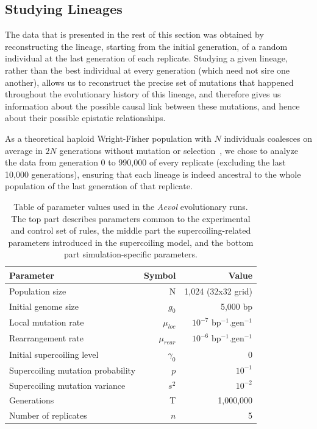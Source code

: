 \subsection{Studying Lineages}

The data that is presented in the rest of this section was obtained by reconstructing the lineage, starting from the initial generation, of a random individual at the last generation of each replicate.
Studying a given lineage, rather than the best individual at every generation (which need not sire one another), allows us to reconstruct the precise set of mutations that happened throughout the evolutionary history of this lineage, and therefore gives us information about the possible causal link between these mutations, and hence about their possible epistatic relationships.

As a theoretical haploid Wright-Fisher population with $N$ individuals coalesces on average in $2N$ generations without mutation or selection~\citep{felsenstein2019}, we chose to analyze the data from generation 0 to 990,000 of every replicate (excluding the last 10,000 generations), ensuring that each lineage is indeed ancestral to the whole population of the last generation of that replicate.

\begin{table}
\begin{center}
\begin{tabular}{ l r r }
\toprule
\textbf{Parameter} & \textbf{Symbol} & \textbf{Value}\\
\midrule
Population size & N & 1,024 (32x32 grid) \\
Initial genome size & $g_0$ & 5,000 bp \\
Local mutation rate & $\mu_{loc}$ & $10^{-7}$ bp$^{-1}$.gen$^{-1}$ \\
Rearrangement rate & $\mu_{rear}$ &$10^{-6}$ bp$^{-1}$.gen$^{-1}$ \\
\midrule
Initial supercoiling level & $\gamma_0$ & 0 \\
Supercoiling mutation probability & $p$ & $10^{-1}$ \\
Supercoiling mutation variance & $s^2$ & $10^{-2}$ \\
\midrule
Generations & T & 1,000,000 \\
Number of replicates & $n$ & 5\\
\bottomrule
\end{tabular}
\end{center}
\caption[Table of parameter values for the \emph{Aevol} runs]{Table of parameter values used in the \emph{Aevol} evolutionary runs.
The top part describes parameters common to the experimental and control set of rules, the middle part the supercoiling-related parameters introduced in the supercoiling model, and the bottom part simulation-specific parameters.}
\label{tab:aevol:param_values}
\end{table}


